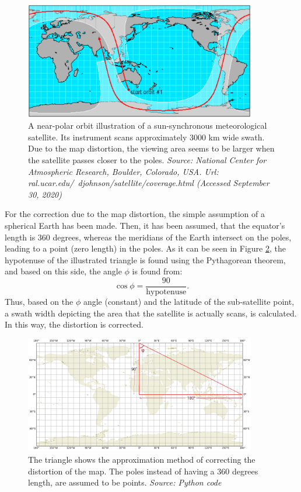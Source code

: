\begin{figure}
\centering
\includegraphics[width=0.9\textwidth]{Images/distortion_show-swath-width.png}\caption{A near-polar orbit illustration of a sun-synchronous meteorological satellite. Its instrument scans approximately 3000 km wide swath. Due to the map distortion, the viewing area seems to be larger when the satellite passes closer to the poles. \textit{Source: National Center for Atmospheric Research, Boulder, Colorado, USA. Url: ral.ucar.edu/~djohnson/satellite/coverage.html (Accessed September 30, 2020)}}
\label{distortion_show-swath-width}
\end{figure}

For the correction due to the map distortion, the simple assumption of a spherical Earth has been made. Then, it has been assumed, that the equator's length is 360 degrees, whereas the meridians of the Earth intersect on the poles, leading to a point (zero length) in the poles. As it can be seen in Figure \ref{correction_map_distortion}, the hypotenuse of the illustrated triangle is found using the Pythagorean theorem, and based on this side, the angle $\phi$ is found from: $$ \cos{\phi} = \frac{90}{\text{hypotenuse}}.$$
Thus, based on the $\phi$ angle (constant) and the latitude of the sub-satellite point, a swath width depicting the area that the satellite is actually scans, is calculated. In this way, the distortion is corrected.

\begin{figure}
\centering
\includegraphics[width=0.9\textwidth]{Images/correction_map_distortion.png}\caption{The triangle shows the approximation method of correcting the distortion of the map. The poles instead of having a 360 degrees length, are assumed to be points. \textit{Source: Python code}}
\label{correction_map_distortion}
\end{figure}

